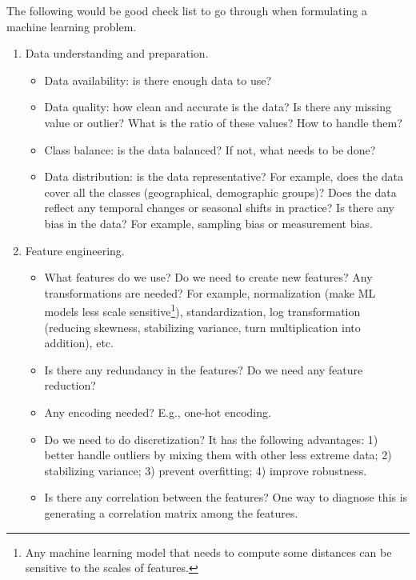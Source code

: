 


The following would be good check list to go through when formulating a machine learning problem.
\begin{enumerate}
    \item Data understanding and preparation.
        \begin{itemize}
            \item Data availability: is there enough data to use?
            \item Data quality: how clean and accurate is the data? Is there any missing value or outlier? What is the ratio of these values? How to handle them?
            \item Class balance: is the data balanced? If not, what needs to be done?
            \item Data distribution: is the data representative? For example, does the data cover all the classes (geographical, demographic groups)? Does the data reflect any temporal changes or seasonal shifts in practice? Is there any bias in the data? For example, sampling bias or measurement bias. 
        \end{itemize}
    \item Feature engineering.
        \begin{itemize}
            \item What features do we use? Do we need to create new features? Any transformations are needed? For example, normalization (make ML models less scale sensitive\footnote{Any machine learning model that needs to compute some distances can be sensitive to the scales of features.}), standardization, log transformation (reducing skewness, stabilizing variance, turn multiplication into addition), etc. 
            \item Is there any redundancy in the features? Do we need any feature reduction? 
            \item Any encoding needed? E.g., one-hot encoding.
            \item Do we need to do discretization? It has the following advantages: 1) better handle outliers by mixing them with other less extreme data; 2) stabilizing variance; 3) prevent overfitting; 4) improve robustness. 
            \item Is there any correlation between the features? One way to diagnose this is generating a correlation matrix among the features. 
        \end{itemize}


\end{enumerate}
